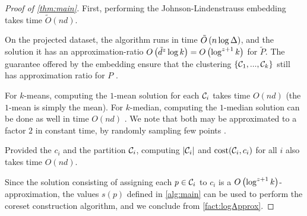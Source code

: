 \begin{proof}[Proof of \cref{thm:main}]
First, performing the Johnson-Lindenstrauss embedding takes time $\tilde O(nd)$.

On the projected dataset, the algorithm \fkmeans runs in time $\tilde O\left( n \log \Delta\right)$, and the solution it has an approximation-ratio $O\left( \tilde{d}^z \log k\right) = O\left(\log^{z+1} k\right)$ for $\tilde P$. 
The guarantee offered by the embedding ensure that the clustering $\left\{ \mathcal C_1,...,\mathcal C_k\right\}$ still has approximation ratio for $P$ \cite{makarychev2019performance}. 

For $k$-means, computing the $1$-mean solution for each $\mathcal C_i$ takes time $O(nd)$ (the $1$-mean is simply the mean). 
For $k$-median, computing the $1$-median solution can be done as well in time $O(nd)$ \cite{CohenLMPS16}. 
We note that both may be approximated to a factor $2$ in constant time, by randomly sampling few points \cite{neurips21}.

Provided the $c_i$ and the partition $\mathcal C_i$, computing $|\mathcal C_i|$ and $\operatorname{cost}(\mathcal C_i, c_i)$ for all $i$ also takes time $O(nd)$.

Since the solution consisting of assigning each $p \in \mathcal C_i$ to $c_i$ is a $O\left( \log^{z+1} k\right)$-approximation, the values $s(p)$ defined in \cref{alg:main} can be used to perform the coreset construction algorithm, and we conclude from \cref{fact:logApprox}.
\end{proof}

%
%
%
%
%

